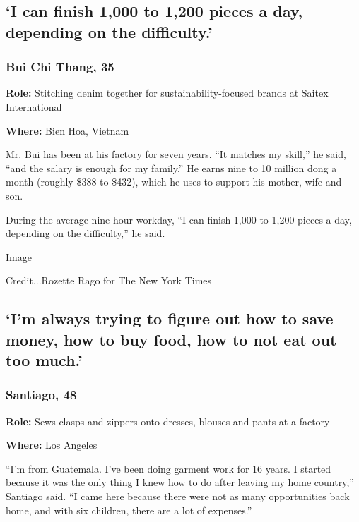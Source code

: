 \hypertarget{i-can-finish-1000-to-1200-pieces-a-day-depending-on-the-difficulty}{%
\subsection{`I can finish 1,000 to 1,200 pieces a day, depending on the
difficulty.'}\label{i-can-finish-1000-to-1200-pieces-a-day-depending-on-the-difficulty}}

\hypertarget{bui-chi-thang-35}{%
\subsubsection{Bui Chi Thang, 35}\label{bui-chi-thang-35}}

\textbf{Role:} Stitching denim together for sustainability-focused
brands at Saitex International

\textbf{Where:} Bien Hoa, Vietnam

Mr. Bui has been at his factory for seven years. ``It matches my
skill,'' he said, ``and the salary is enough for my family.'' He earns
nine to 10 million dong a month (roughly \$388 to \$432), which he uses
to support his mother, wife and son.

During the average nine-hour workday, ``I can finish 1,000 to 1,200
pieces a day, depending on the difficulty,'' he said.

Image

Credit...Rozette Rago for The New York Times

\hypertarget{im-always-trying-to-figure-out-how-to-save-money-how-to-buy-food-how-to-not-eat-out-too-much}{%
\subsection{`I'm always trying to figure out how to save money, how to
buy food, how to not eat out too
much.'}\label{im-always-trying-to-figure-out-how-to-save-money-how-to-buy-food-how-to-not-eat-out-too-much}}

\hypertarget{santiago-48-}{%
\subsubsection{Santiago, 48 }\label{santiago-48-}}

\textbf{Role:} Sews clasps and zippers onto dresses, blouses and pants
at a factory

\textbf{Where:} Los Angeles

``I'm from Guatemala. I've been doing garment work for 16 years. I
started because it was the only thing I knew how to do after leaving my
home country,'' Santiago said. ``I came here because there were not as
many opportunities back home, and with six children, there are a lot of
expenses.''


